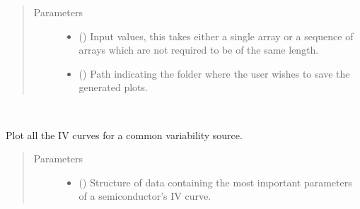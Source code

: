 \documentclass[letterpaper,10pt,english,openany, oneside]{sphinxmanual}
\begin{document}
\begin{fulllineitems}
\begin{fulllineitems}
\begin{quote}\begin{description}
\item[{Parameters}] \leavevmode\begin{itemize}
\item {} 
 (\sphinxstyleliteralemphasis{\sphinxupquote{, }}\sphinxstyleliteralemphasis{\sphinxupquote{ (}}\sphinxstyleliteralemphasis{\sphinxupquote{,}}\sphinxstyleliteralemphasis{\sphinxupquote{)}}) \textendash{} Input values, this takes either a single array or a sequence of arrays
which are not required to be of the same length.

\item {} 
 (\sphinxstyleliteralemphasis{\sphinxupquote{, }}) \textendash{} Path indicating the folder where the user wishes to save the generated plots.

\end{itemize}

\end{description}\end{quote}

\end{fulllineitems}


\begin{fulllineitems}
\label{\detokenize{index:fompy.plots.plotter.varplot}}~

\begin{fulllineitems}
Plot all the IV curves for a common variability source.

\end{fulllineitems}

\begin{quote}\begin{description}
\item[{Parameters}] \leavevmode\begin{itemize}
\item {} 
 () \textendash{} Structure of data containing the most important parameters of a semiconductor’s IV curve.


\end{itemize}
\end{description}
\end{quote}
\end{fulllineitems}
\end{fulllineitems}
\end{document}
